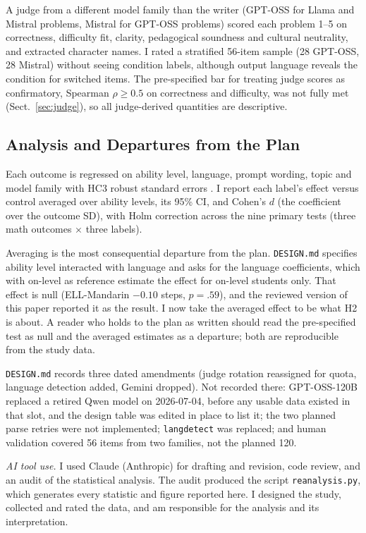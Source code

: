 \documentclass[runningheads,a4paper]{llncs}
\begin{document}
A judge from a different model family than the writer (GPT-OSS for Llama and Mistral problems, Mistral for GPT-OSS problems) scored each problem 1--5 on correctness, difficulty fit, clarity, pedagogical soundness and cultural neutrality, and extracted character names. I rated a stratified 56-item sample (28 GPT-OSS, 28 Mistral) without seeing condition labels, although output language reveals the condition for switched items. The pre-specified bar for treating judge scores as confirmatory, Spearman $\rho\geq0.5$ on correctness and difficulty, was not fully met (Sect.~\ref{sec:judge}), so all judge-derived quantities are descriptive.

\subsection{Analysis and Departures from the Plan}\label{sec:analysis}

Each outcome is regressed on ability level, language, prompt wording, topic and model family with HC3 robust standard errors \cite{mackinnon1985}. I report each label's effect versus control averaged over ability levels, its 95\% CI, and Cohen's $d$ \cite{cohen1988} (the coefficient over the outcome SD), with Holm correction \cite{holm1979} across the nine primary tests (three math outcomes $\times$ three labels).

Averaging is the most consequential departure from the plan. \texttt{DESIGN.md} specifies ability level interacted with language and asks for the language coefficients, which with on-level as reference estimate the effect for on-level students only. That effect is null (ELL-Mandarin $-0.10$ steps, $p=.59$), and the reviewed version of this paper reported it as the result. I now take the averaged effect to be what H2 is about. A reader who holds to the plan as written should read the pre-specified test as null and the averaged estimates as a departure; both are reproducible from the study data.

\texttt{DESIGN.md} records three dated amendments (judge rotation reassigned for quota, language detection added, Gemini dropped). Not recorded there: GPT-OSS-120B replaced a retired Qwen model on 2026-07-04, before any usable data existed in that slot, and the design table was edited in place to list it; the two planned parse retries were not implemented; \texttt{langdetect} was replaced; and human validation covered 56 items from two families, not the planned 120.

\emph{AI tool use.} I used Claude (Anthropic) for drafting and revision, code review, and an audit of the statistical analysis. The audit produced the script \texttt{reanalysis.py}, which generates every statistic and figure reported here. I designed the study, collected and rated the data, and am responsible for the analysis and its interpretation.
\end{document}
